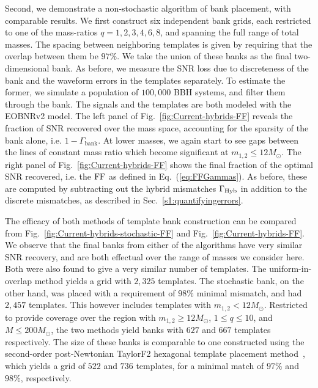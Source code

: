 Second, we demonstrate a non-stochastic algorithm of bank placement, with 
comparable results. We first construct six independent bank grids, each
restricted to one of the mass-ratios $q=1,2,3,4,6,8$, and spanning the full 
range of total masses. The spacing between neighboring templates is
given by requiring that the overlap between them be $97\%$. 
We take the union of these banks as the final 
two-dimensional bank. As before, we measure the SNR loss due to discreteness of
the bank and the waveform errors in the templates separately. To estimate the
former, we simulate a population of $100,000$ BBH systems, and filter
them through the bank. The signals and the templates are both modeled
with the EOBNRv2 model. The left panel of Fig.~\ref{fig:Current-hybrids-FF}
reveals the fraction of SNR recovered over the mass space, accounting for the 
sparsity of the bank alone, i.e. $1-\Gamma_\mathrm{bank}$. At lower masses, 
we again start to see gaps between the lines of constant mass ratio which become
significant at $m_{1,2} \leq 12M_\odot$. 
The right panel of Fig.~\ref{fig:Current-hybrids-FF} shows the final fraction 
of the optimal SNR recovered, i.e. the $\mathrm{FF}$ as defined in Eq.~(\ref{eq:FFGammas}). 
As before, these are computed by subtracting out the hybrid mismatches 
$\Gamma_{\mathrm{Hyb}}$ in addition to the discrete mismatches, as described in
Sec.~\ref{s1:quantifyingerrors}. 

The efficacy of both methods of template bank construction
can be compared from Fig.~\ref{fig:Current-hybrids-stochastic-FF} and 
Fig.~\ref{fig:Current-hybrids-FF}. We observe that the final banks from either
of the algorithms have very similar SNR recovery, and are both effectual over
the range of masses we consider here. Both were also found to give a very 
similar number of templates. The uniform-in-overlap method yields a grid 
with $2,325$ templates. The stochastic bank, on the other hand, was placed with a
requirement of $98\%$ minimal mismatch, and had $2,457$ templates. 
This however includes templates with $m_{1,2} < 12M_\odot$. Restricted
to provide coverage over the region with $m_{1,2}\geq 12M_\odot$, $1\leq q\leq 10$,
and $M\leq 200M_\odot$, the two methods yield banks with $627$ and $667$
templates respectively. The size of these banks is comparable to one 
constructed using the second-order post-Newtonian TaylorF2 hexagonal 
template placement method~\cite{SathyaBankPlacementTauN,BabaketalBankPlacement,
SathyaMetric2PN,Cokelaer:2007kx}, 
which yields a grid of $522$ and $736$ templates, for a minimal
match of $97\%$ and $98\%$, respectively.

